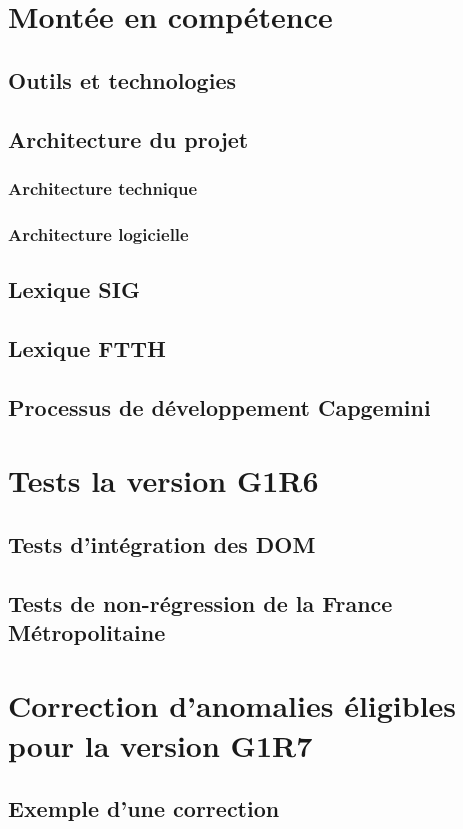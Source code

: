 \chapter{Montée en compétence}
\section{Outils et technologies}
\section{Architecture du projet}
\subsection{Architecture technique}
\subsection{Architecture logicielle}
\section{Lexique SIG}
\section{Lexique FTTH}
\section{Processus de développement Capgemini}
\chapter{Tests la version G1R6}
\section{Tests d'intégration des DOM}
\section{Tests de non-régression de la France Métropolitaine}

\chapter{Correction d'anomalies éligibles pour la version G1R7}
\section{Exemple d'une correction}

